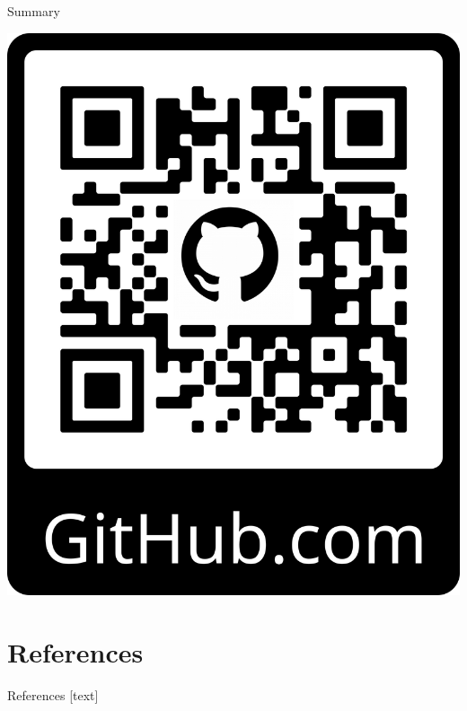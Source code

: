 \documentclass[11pt,aspectratio=1610,dvipsnames]{beamer}
\begin{document}
\begin{frame}{Summary}
\begin{minipage}{0.84\linewidth}
\begin{tcolorbox}[colback=red!5,colframe=gray!15!black,title=Outlook, width=\linewidth]
\begin{multicols}{2}
		\end{multicols}
	
	\end{tcolorbox}
\end{minipage}
\hfill
\begin{minipage}{0.14\linewidth}
	\includegraphics[width=\linewidth]{frame_alt}
\end{minipage}


\end{frame}

\section*{References}
\begin{frame}[allowframebreaks]{References}
	[text]

	\printbibliography
\end{frame}
\end{document}
